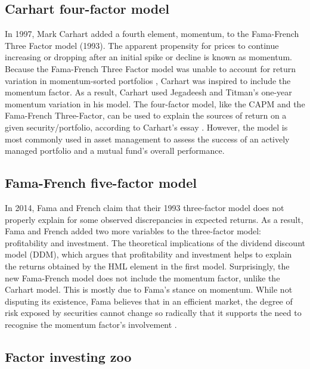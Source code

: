 \documentclass{article}
\begin{document}
\subsection{Carhart four-factor model}

In 1997, Mark Carhart added a fourth element, momentum, to the Fama-French Three Factor model (1993). The apparent propensity for prices to continue increasing or dropping after an initial spike or decline is known as momentum.  Because the Fama-French Three Factor model was unable to account for return variation in momentum-sorted portfolios \cite{carhart1997}, Carhart was inspired to include the momentum factor. As a result, Carhart used Jegadeesh and Titman's \cite{jegadeesh1993} one-year momentum variation in his model. The four-factor model, like the CAPM and the Fama-French Three-Factor, can be used to explain the sources of return on a given security/portfolio, according to Carhart's essay \cite{carhart1997}. However, the model is most commonly used in asset management to assess the success of an actively managed portfolio and a mutual fund's overall performance.\newline


\subsection{Fama-French five-factor model}

In 2014, Fama and French claim that their 1993 three-factor model does not properly explain for some observed discrepancies in expected returns. As a result, Fama and French added two more variables to the three-factor model: profitability and investment. The theoretical implications of the dividend discount model (DDM), which argues that profitability and investment helps to explain the returns obtained by the HML element in the first model. Surprisingly, the new Fama-French model does not include the momentum factor, unlike the Carhart model. This is mostly due to Fama's stance on momentum. While not disputing its existence, Fama believes that in an efficient market, the degree of risk exposed by securities cannot change so radically that it supports the need to recognise the momentum factor's involvement \cite{fama2015}.

\subsection{Factor investing zoo}
\end{document}
